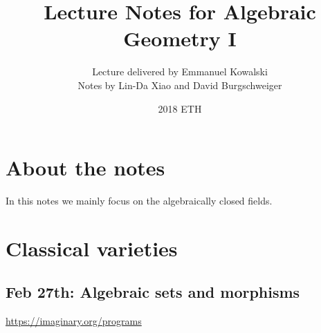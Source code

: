 \documentclass[11pt]{article}
\title{\bf Lecture Notes for Algebraic Geometry I}
\author{Lecture delivered by Emmanuel Kowalski\\
Notes by Lin-Da Xiao and David Burgschweiger}
\date{2018 ETH}
\theoremstyle{definition}
\begin{document}
\maketitle
\tableofcontents
\section*{About the notes}
In this notes we mainly focus on the algebraically closed fields.
\newpage
\section{Classical varieties}
\subsection{Feb 27th: Algebraic sets and morphisms}
\href{https://imaginary.org/programs}{https://imaginary.org/programs}
\end{document}
